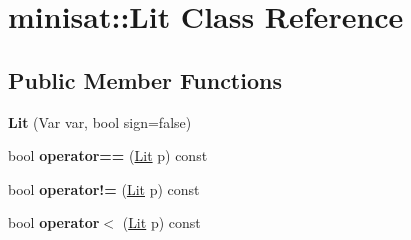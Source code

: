 \hypertarget{classminisat_1_1Lit}{\section{minisat\-:\-:\-Lit \-Class \-Reference}
\label{classminisat_1_1Lit}
}
\subsection*{\-Public \-Member \-Functions}
\begin{DoxyCompactItemize}
\item 
\hypertarget{classminisat_1_1Lit_a0adee251c14fbd672775876df273c8f4}{{\bfseries \-Lit} (\-Var var, bool sign=false)}\label{classminisat_1_1Lit_a0adee251c14fbd672775876df273c8f4}

\item 
\hypertarget{classminisat_1_1Lit_adba3572dbc2ba73675ad5b60cf479383}{bool {\bfseries operator==} (\hyperlink{classminisat_1_1Lit}{\-Lit} p) const }\label{classminisat_1_1Lit_adba3572dbc2ba73675ad5b60cf479383}

\item 
\hypertarget{classminisat_1_1Lit_a9c13f6f28275912311740202058052db}{bool {\bfseries operator!=} (\hyperlink{classminisat_1_1Lit}{\-Lit} p) const }\label{classminisat_1_1Lit_a9c13f6f28275912311740202058052db}

\item 
\hypertarget{classminisat_1_1Lit_a50c0e944d2a54ac7d7c8080570378b04}{bool {\bfseries operator$<$} (\hyperlink{classminisat_1_1Lit}{\-Lit} p) const }\label{classminisat_1_1Lit_a50c0e944d2a54ac7d7c8080570378b04}

\end{DoxyCompactItemize}
